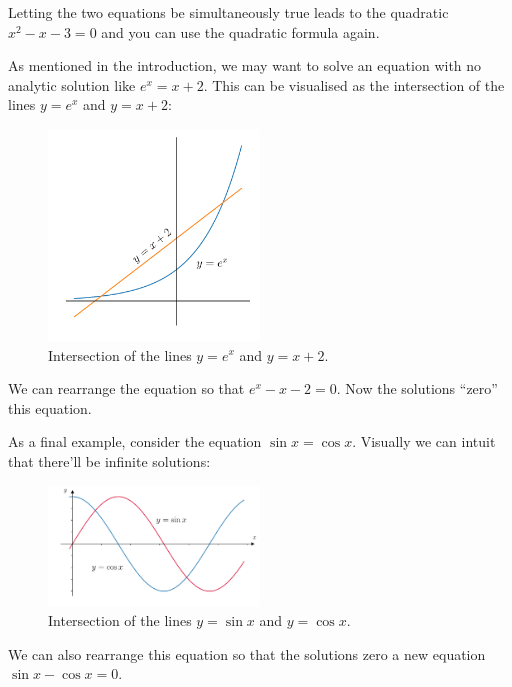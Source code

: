 \noindent Letting the two equations be simultaneously true leads to the quadratic $x^2 - x - 3 = 0$ and you can use the quadratic formula again. 

As mentioned in the introduction, we may want to solve an equation with no analytic solution like $e^x = x+2$. This can be visualised as the intersection of the lines $y=e^x$ and $y=x+2$:
\begin{figure}[h]
	\begin{center}
	\includegraphics[width=0.5\textwidth]{figures/ch1_intersection1.pdf} 
	  \caption{Intersection of the lines $y=e^x$ and $y=x+2$.} \label{fig:ch2_intersection2}
	\end{center}
\end{figure}

\noindent We can rearrange the equation so that $e^x - x - 2 = 0$. Now the solutions ``zero'' this equation.

As a final example, consider the equation $\sin x = \cos x$. Visually we can intuit that there'll be infinite solutions:
\begin{figure}[H]
	\begin{center}
	\includegraphics[width=0.5\textwidth]{figures/ch2_intersection3.pdf} 
	  \caption{Intersection of the lines $y=\sin x$ and $y=\cos x$.} \label{fig:ch2_intersection3}
	\end{center}
\end{figure}

\noindent We can also rearrange this equation so that the solutions zero a new equation $\sin x - \cos x = 0$.

